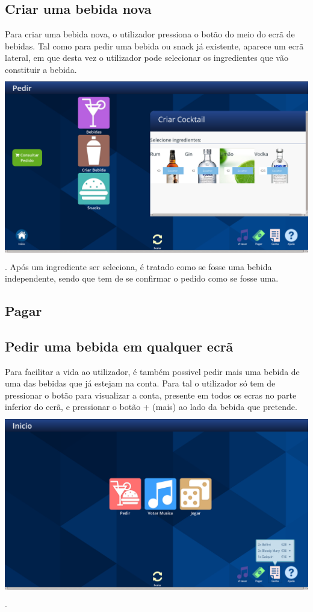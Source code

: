 \documentclass{article}
\begin{document}
\subsection{Criar uma bebida nova}
Para criar uma bebida nova, o utilizador pressiona o botão do meio do ecrã de bebidas. Tal como para pedir uma bebida ou snack já existente, aparece um ecrã lateral, em que desta vez o utilizador pode selecionar os ingredientes que vão constituir a bebida.\\
\includegraphics[width=15cm, height=8cm]{user_manual_images/create_submenu.png}.
Após um ingrediente ser seleciona, é tratado como se fosse uma bebida independente, sendo que tem de se confirmar o pedido como se fosse uma.
\subsection{Pagar}
\subsection{Pedir uma bebida em qualquer ecrã}
Para facilitar a vida ao utilizador, é também possivel pedir mais uma bebida de uma das bebidas que já estejam na conta. Para tal o utilizador só tem de pressionar o botão para visualizar a conta, presente em todos os ecras no parte inferior do ecrã, e pressionar o botão + (mais) ao lado da bebida que pretende.\\
\includegraphics[width=15cm, height=8cm]{user_manual_images/order_ballon.png}.
\end{document}
